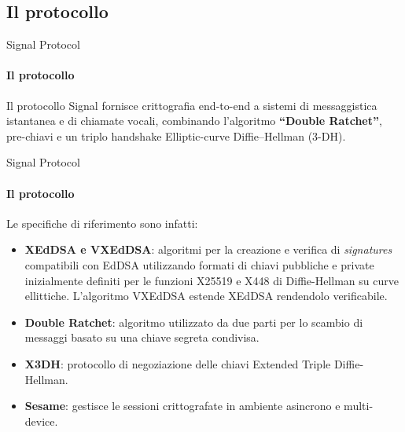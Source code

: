 \subsection{Il protocollo}

\begin{frame}{Signal Protocol}
    \framesubtitle{Il protocollo}
    Il protocollo Signal fornisce crittografia end-to-end a sistemi di messaggistica istantanea e di chiamate vocali, combinando l'algoritmo \textbf{``Double Ratchet''}, pre-chiavi e un triplo handshake Elliptic-curve Diffie–Hellman (3-DH). 
\end{frame}

\begin{frame}{Signal Protocol}
    \framesubtitle{Il protocollo}
    Le specifiche di riferimento sono infatti: \cite{signal}
    \begin{itemize}
        \item \textbf{XEdDSA e VXEdDSA}: algoritmi per la creazione e verifica di \textit{signatures} compatibili con EdDSA utilizzando formati di chiavi pubbliche e private inizialmente definiti per le funzioni X25519 e X448 di Diffie-Hellman su curve ellittiche. L'algoritmo VXEdDSA estende XEdDSA rendendolo verificabile.\pause
        \item \textbf{Double Ratchet}: algoritmo utilizzato da due parti per lo scambio di messaggi basato su una chiave segreta condivisa. \pause
        \item \textbf{X3DH}: protocollo di negoziazione delle chiavi Extended Triple Diffie-Hellman.\pause
        \item \textbf{Sesame}: gestisce le sessioni crittografate in ambiente asincrono e multi-device.
    \end{itemize}
    
\end{frame}
